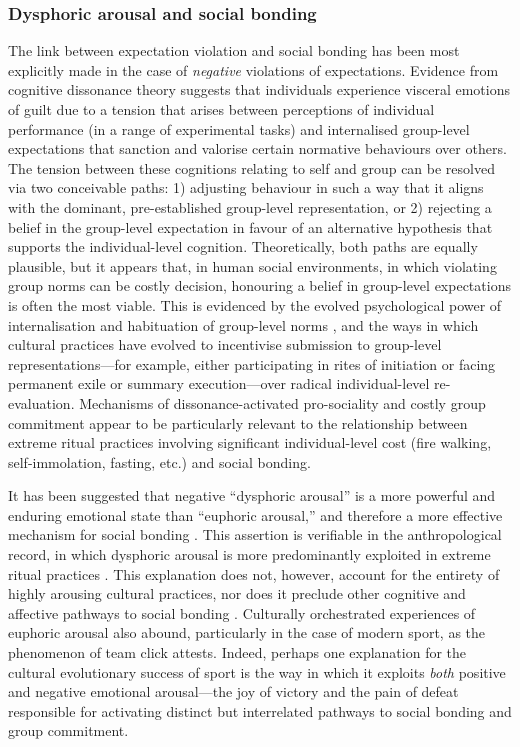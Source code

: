 \begin{CJK}{UTF8}{gbsn}
\subsubsection{Dysphoric arousal and social bonding}
The link between expectation violation and social bonding has been most explicitly made in the case of \textit{negative} violations of expectations.  Evidence from cognitive dissonance theory \citep{Festinger1957} suggests that individuals experience visceral emotions of guilt due to a tension that arises between perceptions of individual performance (in a range of experimental tasks) and internalised group-level expectations that sanction and valorise certain normative behaviours over others\citep{Kenworthy2011,Stone2001}.  The tension between these cognitions relating to self and group can be resolved via two conceivable paths: 1) adjusting behaviour in such a way that it aligns with the dominant, pre-established group-level representation, or 2) rejecting a belief in the group-level expectation in favour of an alternative hypothesis that supports the individual-level cognition.
Theoretically, both paths are equally plausible, but it appears that, in human social environments, in which violating group norms can be costly decision, honouring a belief in group-level expectations is often the most viable.  This is evidenced by the evolved psychological power of internalisation and habituation of group-level norms \citep{Chudek2011}, and the ways in which cultural practices have evolved to incentivise submission to group-level representations---for example, either participating in rites of initiation or facing permanent exile or summary execution\citep[cf.][18]{Whitehouse2014}---over radical individual-level re-evaluation\citep{Sosis2003}.
Mechanisms of dissonance-activated pro-sociality and costly group commitment appear to be particularly relevant to the relationship between extreme ritual practices involving significant individual-level cost (fire walking, self-immolation, fasting, etc.) and social bonding\citep{Sosis2003,Xygalatas2013,Bastian2014,Fischer2014,Whitehouse2014}.

It has been suggested that negative ``dysphoric arousal'' is a more powerful and enduring emotional state than ``euphoric arousal,'' and therefore a more effective mechanism for social bonding \citep{Whitehouse1996,Whitehouse2004}.  This assertion is verifiable in the anthropological record, in which dysphoric arousal is more predominantly exploited in extreme ritual practices \citep{Atkinson2011,Whitehouse2014}. This explanation does not, however, account for the entirety of highly arousing cultural practices, nor does it preclude other cognitive and affective pathways to social bonding \citep{Downey2014,Xygalatas2014,Fischer2014,Fischer2014a}.  Culturally orchestrated experiences of euphoric arousal also abound, particularly in the case of modern sport, as the phenomenon of team click attests. Indeed, perhaps one explanation for the cultural evolutionary success of sport is the way in which it exploits \textit{both} positive and negative emotional arousal---the joy of victory and the pain of defeat responsible for activating distinct but interrelated pathways to social bonding and group commitment.



\end{CJK}
